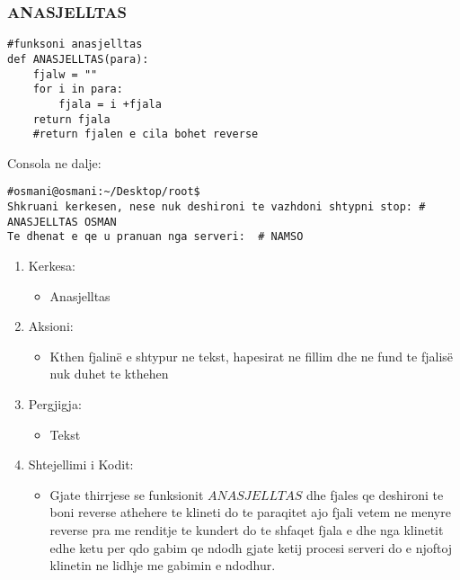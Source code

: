 \documentclass[]{article}
\begin{document}
\subsubsection{ANASJELLTAS}
\begin{lstlisting}
#funksoni anasjelltas
def ANASJELLTAS(para):
    fjalw = "" 
    for i in para:
        fjala = i +fjala
    return fjala
    #return fjalen e cila bohet reverse
\end{lstlisting}
\vspace*{1cm}
\noindent Consola ne dalje:
\begin{lstlisting}
#osmani@osmani:~/Desktop/root$
Shkruani kerkesen, nese nuk deshironi te vazhdoni shtypni stop: # ANASJELLTAS OSMAN
Te dhenat e qe u pranuan nga serveri:  # NAMSO

\end{lstlisting}
\begin{enumerate}
\item Kerkesa:
\begin{itemize}
\item Anasjelltas
\end{itemize}
\item Aksioni:
\begin{itemize}
\item Kthen fjalinë e shtypur ne tekst, hapesirat ne fillim dhe ne fund te fjalisë nuk duhet te kthehen
\end{itemize}
\item Pergjigja:
\begin{itemize}
\item Tekst
\end{itemize}

\item Shtejellimi i Kodit:
\begin{itemize}
\item Gjate thirrjese se funksionit $ANASJELLTAS$ dhe fjales qe deshironi te boni reverse athehere te klineti do te paraqitet ajo fjali vetem ne menyre reverse pra me renditje te kundert do te shfaqet fjala e dhe nga  klinetit edhe ketu per qdo gabim qe ndodh gjate ketij procesi serveri do e njoftoj klinetin ne lidhje me gabimin e ndodhur.
\end{itemize}
\end{enumerate}
\newpage
\end{document}
